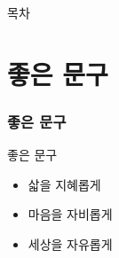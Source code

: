 \documentclass[aspectratio=1610,20pt,xcolor=pdftex,dvipsnames,table,handout]{beamer}
\begin{document}
\label{part4} 	%

		\begin{frame} [plain]{목차}
		\tableofcontents%
		\end{frame}

		\begin{frame} [t,plain]
		\end{frame}						
		\begin{frame} [t,plain]
		\end{frame}						



		\section{좋은 문구}

		\begin{frame} [t,plain]
		\frametitle{좋은 문구}
			\begin{block} {좋은 문구}
			\setlength{\leftmargini}{2em}			
			\begin{itemize}
				\item 삷을 지혜롭게
				\item 마음을 자비롭게
				\item 세상을 자유롭게

			\end{itemize}
			\end{block}						
		\end{frame}						


		\begin{frame} [t,plain]
		\end{frame}						
		\begin{frame} [t,plain]
		\end{frame}						
		\begin{frame} [t,plain]
		\end{frame}						


\end{document}
